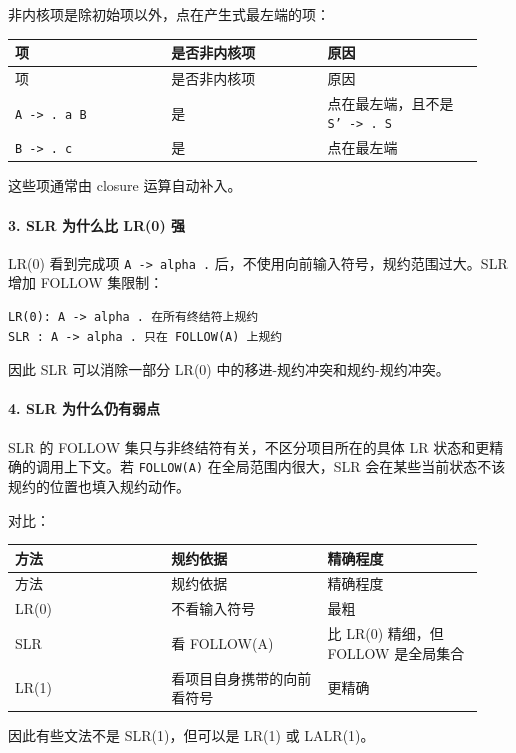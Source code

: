 \documentclass[UTF8]{ctexart}
\begin{document}
非内核项是除初始项以外，点在产生式最左端的项：

\begin{longtable}{|p{0.31\linewidth}|p{0.31\linewidth}|p{0.31\linewidth}|}
\hline
项 & 是否非内核项 & 原因 \\
\hline
\endfirsthead
项 & 是否非内核项 & 原因 \\
\hline
\endhead
\texttt{A -> . a B} & 是 & 点在最左端，且不是 \texttt{S' -> . S} \\
\hline
\texttt{B -> . c} & 是 & 点在最左端 \\
\hline
\end{longtable}

这些项通常由 closure 运算自动补入。

\paragraph*{3. SLR 为什么比 LR(0) 强}

LR(0) 看到完成项 \texttt{A -> alpha .} 后，不使用向前输入符号，规约范围过大。SLR 增加 FOLLOW 集限制：

\begin{Verbatim}[fontsize=\small,breaklines=true]
LR(0): A -> alpha . 在所有终结符上规约
SLR : A -> alpha . 只在 FOLLOW(A) 上规约
\end{Verbatim}

因此 SLR 可以消除一部分 LR(0) 中的移进-规约冲突和规约-规约冲突。

\paragraph*{4. SLR 为什么仍有弱点}

SLR 的 FOLLOW 集只与非终结符有关，不区分项目所在的具体 LR 状态和更精确的调用上下文。若 \texttt{FOLLOW(A)} 在全局范围内很大，SLR 会在某些当前状态不该规约的位置也填入规约动作。

对比：

\begin{longtable}{|p{0.31\linewidth}|p{0.31\linewidth}|p{0.31\linewidth}|}
\hline
方法 & 规约依据 & 精确程度 \\
\hline
\endfirsthead
方法 & 规约依据 & 精确程度 \\
\hline
\endhead
LR(0) & 不看输入符号 & 最粗 \\
\hline
SLR & 看 FOLLOW(A) & 比 LR(0) 精细，但 FOLLOW 是全局集合 \\
\hline
LR(1) & 看项目自身携带的向前看符号 & 更精确 \\
\hline
\end{longtable}

因此有些文法不是 SLR(1)，但可以是 LR(1) 或 LALR(1)。
\end{document}

